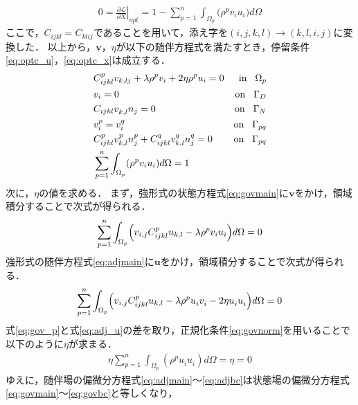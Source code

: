 \begin{align}
	0=\left.\frac{\partial\mathscr{L}}{\partial X}\right|_{opt}
	=1-\sum_{p=1}^{n}\int_{\Omega_p}\bigr(\rho^{p}v_{i}u_{i}\bigl) d\Omega
	\label{eq:lagrange_xderivative}
\end{align}
ここで，$C_{ijkl}=C_{klij}$であることを用いて，添え字を$(i,j,k,l)\rightarrow(k,l,i,j)$に変換した．
以上から，$\bm{v}$，$\eta$が以下の随伴方程式を満たすとき，停留条件\eqref{eq:optc_u}，\eqref{eq:optc_x}は成立する．
\begin{align}
	&C_{ijkl}^{p}v_{k,lj}+\lambda\rho^{p}v_{i}+2\eta\rho^{p} u_{i}=0&\text{in}\hspace{0.3cm}\Omega_{p}
	\label{eq:adjmain}
	\\
	&v_{i}=0 &\text{on}\hspace{0.3cm}\Gamma_{D}
	\\
	&C_{ijkl}v_{k,l}^{}n_{j}=0 &\text{on}\hspace{0.3cm}\Gamma_{N}
	\\
	&v_{i}^{p}=v_{i}^{q} &\text{on}\hspace{0.3cm}\Gamma_{pq}
	\\
	&C_{ijkl}^{p}v_{k,l}^{p}n_{j}^{p}+C_{ijkl}^{q}v_{k,l}^{q}n_{j}^{q}=0 &\text{on}\hspace{0.3cm}\Gamma_{pq}
	\label{eq:adjbc}
	\\
	&\sum_{p=1}^{n}\int_{\Omega_p}(\rho^{p}v_{i}u_{i}) d\Omega=1
	\label{eq:adjnorm}
\end{align}
次に，$\eta$の値を求める．
まず，強形式の状態方程式\eqref{eq:govmain}に$\bm{v}$をかけ，領域積分することで次式が得られる．
\begin{align}
	\sum_{p=1}^{n}\int_{\Omega_p}\Bigr(v_{i,j}C_{ijkl}^{p}u_{k,l}-\lambda\rho^{p}v_{i}u_{i}\Bigl) d\Omega=0
	\label{eq:gov_p}
\end{align}
強形式の随伴方程式\eqref{eq:adjmain}に$\bm{u}$をかけ，領域積分することで次式が得られる．
\begin{align}
	\sum_{p=1}^{n}\int_{\Omega_p}\Bigr(v_{i,j}C_{ijkl}^{p}u_{k,l}-\lambda\rho^{p}u_{i}^{}v_{i}^{}-2\eta u_{i}^{}u_{i}^{}\Bigl) d\Omega=0
	\label{eq:adj_u}
\end{align}
式\eqref{eq:gov_p}と式\eqref{eq:adj_u}の差を取り，正規化条件\eqref{eq:govnorm}を用いることで以下のように$\eta$が求まる．
\begin{align}
	\eta\sum_{p=1}^{n}\int_{\Omega_p}(\rho^{p}u_{i}^{}u_{i}^{}) d\Omega=\eta=0
	\label{eq:eta_0}
\end{align}
ゆえに，随伴場の偏微分方程式\eqref{eq:adjmain}～\eqref{eq:adjbc}は状態場の偏微分方程式\eqref{eq:govmain}～\eqref{eq:govbc}と等しくなり，
